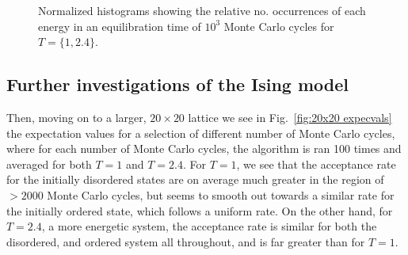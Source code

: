 \documentclass[10pt,showpacs,preprintnumbers,amsmath,amssymb,nofootinbib,aps,prl,twocolumn,groupedaddress,superscriptaddress,showkeys]{revtex4-1}
\begin{document}
  \begin{figure}[H]
    \centering

    \caption{\label{fig:histo}Normalized histograms showing the relative no. occurrences of each energy in an equilibration time of $10^3$ Monte Carlo cycles for $T=\{1, 2.4\}$.}
  \end{figure}
  \subsection{Further investigations of the Ising model}

  Then, moving on to a larger, $20\times20$ lattice we see in Fig.~\ref{fig:20x20 expecvals} the expectation values for a selection of different number of Monte Carlo cycles, where for each number of Monte Carlo cycles, the algorithm is ran 100 times and averaged for both $T=1$ and $T=2.4$. For $T=1$, we see that the acceptance rate for the initially disordered states are on average much greater in the region of $>2000$ Monte Carlo cycles, but seems to smooth out towards a similar rate for the initially ordered state, which follows a uniform rate. On the other hand, for $T=2.4$, a more energetic system, the acceptance rate is similar for both the disordered, and ordered system all throughout, and is far greater than for $T=1$.
\end{document}
